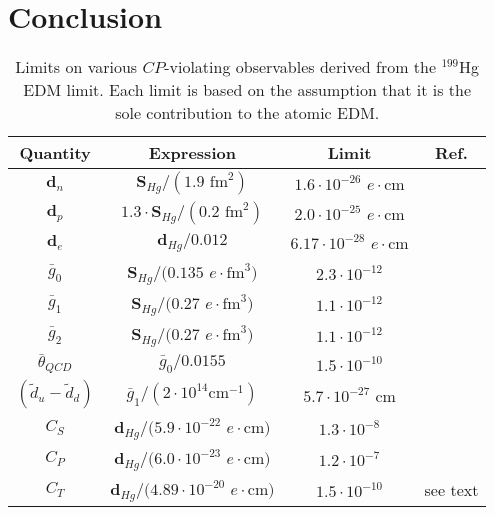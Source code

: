 \documentclass [10pt, twoside] {uwthesis}[2012/04/02]
\begin{document}
\section{Conclusion}
\begin{table}[t] 														%
\begin{center} 
\caption[Limits on $CP$-violating observables] 
{\narrower Limits on various $CP$-violating observables derived from the $^{199}$Hg EDM limit. Each limit is based on the assumption that it is the sole contribution to the atomic EDM.}\label{Limits}
\begin{tabular}{cccc}													%
\hline \hline	 														%
Quantity & Expression & Limit & Ref. \\ 								%
\hline 																	%
$\mathbf{d}_n$	& $\mathbf{S}_{Hg}/(1.9 \text{ fm}^2)$ 		& $1.6\cdot 10^{-26}$ $e\cdot\text{cm}$ & \cite{2003_Dmitriev_and_Sen'kov_Hg_Schiff_Moment}\\
$\mathbf{d}_p$	& $1.3\cdot\mathbf{S}_{Hg}/(0.2 \text{ fm}^2)$	& $2.0\cdot 10^{-25}$ $e\cdot\text{cm}$ & \cite{2003_Dmitriev_and_Sen'kov_Hg_Schiff_Moment}\\
$\mathbf{d}_e$	& $\mathbf{d}_{Hg}/0.012$ & $6.17 \cdot 10^{-28}$ $e\cdot\text{cm}$ & \cite{1987_Martensson_Oster_eEDM}\\
$\bar{g}_0$ 	& $\mathbf{S}_{Hg}/(0.135$ $e\cdot\text{fm}^3)$ & $2.3\cdot 10^{-12}$ & \cite{2013_Engel_et_al_EDM_review}\\
$\bar{g}_1$ 	& $\mathbf{S}_{Hg}/(0.27$ $e\cdot\text{fm}^3)$ 	& $1.1\cdot 10^{-12}$ & \cite{2013_Engel_et_al_EDM_review}\\
$\bar{g}_2$ 	& $\mathbf{S}_{Hg}/(0.27$ $e\cdot\text{fm}^3)$ 	& $1.1\cdot 10^{-12}$ & \cite{2013_Engel_et_al_EDM_review}\\
$\bar{\theta}_{QCD}$ 	& $\bar{g}_0/0.0155$ 					& $1.5\cdot 10^{-10}$ & \cite{2015_deVries_Mereghetti_Walker_CP_violation_in_CPT, 2015_Bsaisou_et_al_Nucleon_EDMs_in_chiral_EFT}\\
$(\widetilde{d}_u-\widetilde{d}_d)$ & $\bar{g}_1/(2\cdot10^{14} \text{cm}^{-1})$ & $5.7\cdot 10^{-27} \text{ cm}$& \cite{2002_Pospelov_quark_chromo_EDM}\\
$C_S$ 			& $\mathbf{d}_{Hg}/(5.9 \cdot10^{-22}$ $e\cdot\text{cm})$ & $1.3\cdot 10^{-8}$ & \cite{2004_Ginges_Flambaum_Fund._Symmetries_in_Atoms}\\
$C_P$			& $\mathbf{d}_{Hg}/(6.0\cdot10^{-23}$ $e\cdot\text{cm)}$ & $1.2\cdot 10^{-7}$ & \cite{2004_Ginges_Flambaum_Fund._Symmetries_in_Atoms}\\
$C_T$			& $\mathbf{d}_{Hg}/(4.89 \cdot10^{-20}$ $e\cdot\text{cm})$ & $1.5\cdot 10^{-10}$ & see text\\
\hline \hline															%
\end{tabular} 
\end{center}
\end{table}
\end{document}
